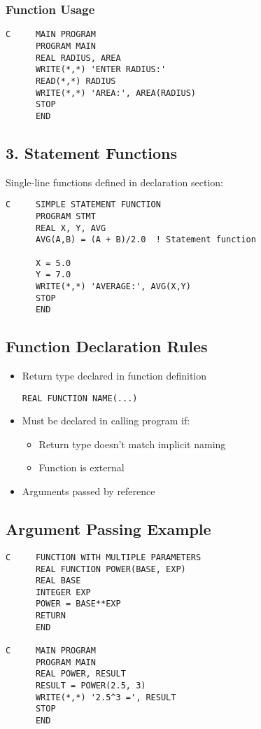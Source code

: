 \documentclass{book}
\begin{document}
\subsubsection*{Function Usage}
\begin{verbatim}
C     MAIN PROGRAM
      PROGRAM MAIN
      REAL RADIUS, AREA
      WRITE(*,*) 'ENTER RADIUS:'
      READ(*,*) RADIUS
      WRITE(*,*) 'AREA:', AREA(RADIUS)
      STOP
      END
\end{verbatim}

\subsection*{3. Statement Functions}
Single-line functions defined in declaration section:
\begin{verbatim}
C     SIMPLE STATEMENT FUNCTION
      PROGRAM STMT
      REAL X, Y, AVG
      AVG(A,B) = (A + B)/2.0  ! Statement function
      
      X = 5.0
      Y = 7.0
      WRITE(*,*) 'AVERAGE:', AVG(X,Y)
      STOP
      END
\end{verbatim}

\subsection*{Function Declaration Rules}
\begin{itemize}
\item Return type declared in function definition
\begin{verbatim}
REAL FUNCTION NAME(...)
\end{verbatim}
\item Must be declared in calling program if:
  \begin{itemize}
  \item Return type doesn't match implicit naming
  \item Function is external
  \end{itemize}
\item Arguments passed by reference
\end{itemize}

\subsection*{Argument Passing Example}
\begin{verbatim}
C     FUNCTION WITH MULTIPLE PARAMETERS
      REAL FUNCTION POWER(BASE, EXP)
      REAL BASE
      INTEGER EXP
      POWER = BASE**EXP
      RETURN
      END

C     MAIN PROGRAM
      PROGRAM MAIN
      REAL POWER, RESULT
      RESULT = POWER(2.5, 3)
      WRITE(*,*) '2.5^3 =', RESULT
      STOP
      END
\end{verbatim}
\end{document}
